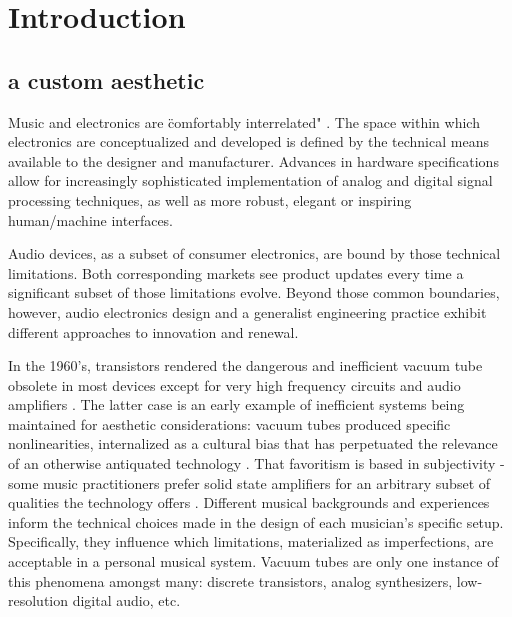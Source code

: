 \chapter{Introduction}\label{introduction}



\section{a custom aesthetic}

Music and electronics are \"comfortably interrelated" \cite{kettelkamp1984}. The space within which electronics are conceptualized and developed is defined by the technical means available to the designer and manufacturer. Advances in hardware specifications allow for increasingly sophisticated implementation of analog and digital signal processing techniques, as well as more robust, elegant or inspiring human/machine interfaces.  
	
Audio devices, as a subset of consumer electronics, are bound by those technical limitations. Both corresponding markets see product updates every time a significant subset of those limitations evolve. Beyond those common boundaries, however, audio electronics design and a generalist engineering practice exhibit different approaches to innovation and renewal. 

In the 1960's, transistors rendered the dangerous and inefficient vacuum tube obsolete in most devices except for very high frequency circuits and audio amplifiers \cite{barbour1998}. The latter case is an early example of inefficient systems being maintained for aesthetic considerations: vacuum tubes produced specific nonlinearities, internalized as a cultural bias that has perpetuated the relevance of an otherwise antiquated technology \cite{barbour1998}. That favoritism is based in subjectivity - some music practitioners prefer solid state amplifiers for an arbitrary subset of qualities the technology offers \cite{hamm1973}. Different musical backgrounds and experiences inform the technical choices made in the design of each musician's specific setup. Specifically, they influence which limitations, materialized as imperfections, are acceptable in a personal musical system. Vacuum tubes are only one instance of this phenomena amongst many: discrete transistors, analog synthesizers, low-resolution digital audio, etc.  

